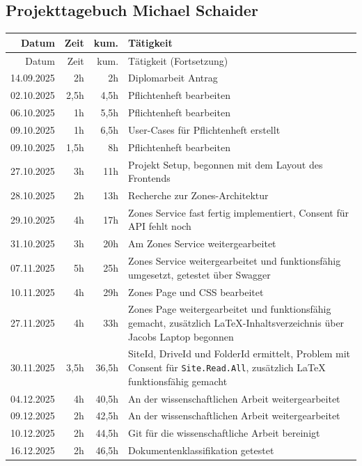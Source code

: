 \subsection{Projekttagebuch Michael Schaider}
\begin{longtable}{r | r | r | p{}}
    Datum & Zeit & kum. & Tätigkeit \\ \hline
    \endfirsthead

    Datum & Zeit & kum. & Tätigkeit (Fortsetzung) \\ \hline
    \endhead

    14.09.2025 & 2h & 2h & Diplomarbeit Antrag \\
    02.10.2025 & 2,5h & 4,5h & Pflichtenheft bearbeiten \\
    06.10.2025 & 1h & 5,5h & Pflichtenheft bearbeiten \\
    09.10.2025 & 1h & 6,5h & User-Cases für Pflichtenheft erstellt \\
    09.10.2025 & 1,5h & 8h & Pflichtenheft bearbeiten \\
    27.10.2025 & 3h & 11h & Projekt Setup, begonnen mit dem Layout des Frontends \\
    28.10.2025 & 2h & 13h & Recherche zur Zones-Architektur \\
    29.10.2025 & 4h & 17h & Zones Service fast fertig implementiert, Consent für API fehlt noch \\
    31.10.2025 & 3h & 20h & Am Zones Service weitergearbeitet \\
    07.11.2025 & 5h & 25h & Zones Service weitergearbeitet und funktionsfähig umgesetzt, getestet über Swagger \\
    10.11.2025 & 4h & 29h & Zones Page und CSS bearbeitet \\
    27.11.2025 & 4h & 33h & Zones Page weitergearbeitet und funktionsfähig gemacht, zusätzlich LaTeX-Inhaltsverzeichnis über Jacobs Laptop begonnen \\
    30.11.2025 & 3,5h & 36,5h & SiteId, DriveId und FolderId ermittelt, Problem mit Consent für \texttt{Site.Read.All}, zusätzlich LaTeX funktionsfähig gemacht \\
    04.12.2025 & 4h & 40,5h & An der wissenschaftlichen Arbeit weitergearbeitet \\
    09.12.2025 & 2h & 42,5h & An der wissenschaftlichen Arbeit weitergearbeitet \\
    10.12.2025 & 2h & 44,5h & Git für die wissenschaftliche Arbeit bereinigt \\
    16.12.2025 & 2h & 46,5h & Dokumentenklassifikation getestet \\

\end{longtable}
